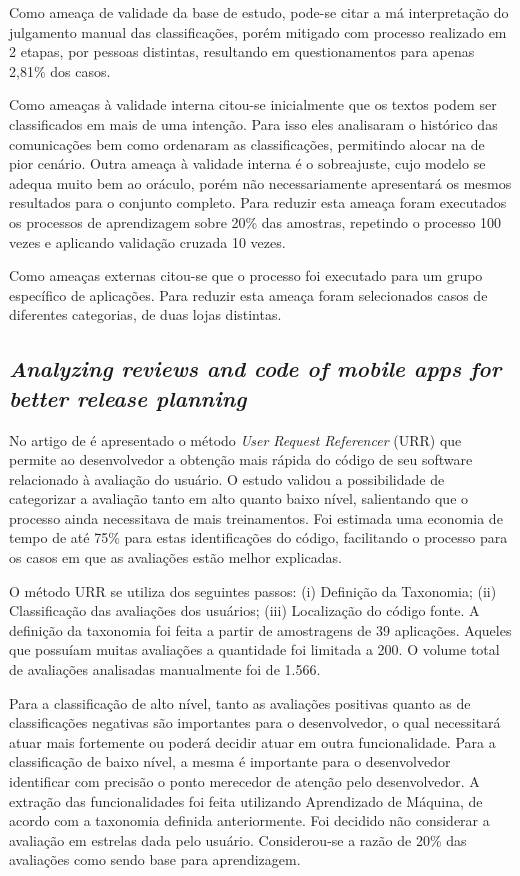 Como ameaça de validade da base de estudo, pode-se citar a má interpretação do julgamento manual das classificações, porém mitigado com processo realizado em 2 etapas, por pessoas distintas, resultando em questionamentos para apenas 2,81\% dos casos.

Como ameaças à validade interna citou-se inicialmente que os textos podem ser classificados em mais de uma intenção. Para isso eles analisaram o histórico das comunicações bem como ordenaram as classificações, permitindo alocar na de pior cenário. Outra ameaça à validade interna é o sobreajuste, cujo modelo se adequa muito bem ao oráculo, porém não necessariamente apresentará os mesmos resultados para o conjunto completo. Para reduzir esta ameaça foram executados os processos de aprendizagem sobre 20\% das amostras, repetindo o processo 100 vezes e aplicando validação cruzada 10 vezes.

Como ameaças externas citou-se que o processo foi executado para um grupo específico de aplicações. Para reduzir esta ameaça foram selecionados casos de diferentes categorias, de duas lojas distintas.

\subsection{\textit{Analyzing reviews and code of mobile apps for better release planning}}
No artigo de  é apresentado o método \textit{User Request Referencer} (URR) que permite ao desenvolvedor a obtenção mais rápida do código de seu software relacionado à avaliação do usuário. O estudo validou a possibilidade de categorizar a avaliação tanto em alto quanto baixo nível, salientando que o processo ainda necessitava de mais treinamentos.
Foi estimada uma economia de tempo de até 75\% para estas identificações do código, facilitando o processo para os casos em que as avaliações estão melhor explicadas.

O método URR se utiliza dos seguintes passos: (i) Definição da Taxonomia; (ii) Classificação das avaliações dos usuários; (iii) Localização do código fonte.
A definição da taxonomia foi feita a partir de amostragens de 39 aplicações. Aqueles que possuíam muitas avaliações a quantidade foi limitada a 200. O volume total de avaliações analisadas manualmente foi de 1.566.

Para a classificação de alto nível, tanto as avaliações positivas quanto as de classificações negativas são importantes para o desenvolvedor, o qual necessitará atuar mais fortemente ou poderá decidir atuar em outra funcionalidade.
Para a classificação de baixo nível, a mesma é importante para o desenvolvedor identificar com precisão o ponto merecedor de atenção pelo desenvolvedor.
A extração das funcionalidades foi feita utilizando Aprendizado de Máquina, de acordo com a taxonomia definida anteriormente. Foi decidido não considerar a avaliação em estrelas dada pelo usuário. Considerou-se a razão de 20\% das avaliações como sendo base para aprendizagem.

